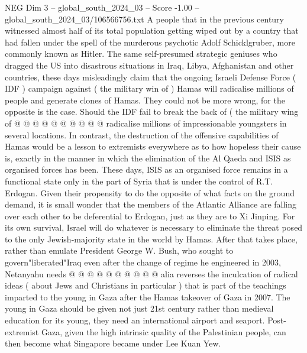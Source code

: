 \begin{textsample}{NEG Dim 3 – global\_south\_2024\_03 – Score -1.00 – global\_south\_2024\_03/106566756.txt}
A people that in the previous century witnessed almost half of its total population getting wiped out by a country that had fallen under the spell of the murderous psychotic Adolf Schicklgruber, more commonly known as Hitler.
The same self-presumed strategic geniuses who dragged the US into disastrous situations in Iraq, Libya, Afghanistan and other countries, these days misleadingly claim that the ongoing Israeli Defense Force ( IDF ) campaign against ( the military win of ) Hamas will radicalise millions of people and generate clones of Hamas.
They could not be more wrong, for the opposite is the case.
Should the IDF fail to break the back of ( the military wing of @ @ @ @ @ @ @ @ @ @ radicalise millions of impressionable youngsters in several locations.
In contrast, the destruction of the offensive capabilities of Hamas would be a lesson to extremists everywhere as to how hopeless their cause is, exactly in the manner in which the elimination of the Al Qaeda and ISIS as organised forces has been.
These days, ISIS as an organised force remains in a functional state only in the part of Syria that is under the control of R.T.
Erdogan.
Given their propensity to do the opposite of what facts on the ground demand, it is small wonder that the members of the Atlantic Alliance are falling over each other to be deferential to Erdogan, just as they are to Xi Jinping.
For its own survival, Israel will do whatever is necessary to eliminate the threat posed to the only Jewish-majority state in the world by Hamas.
After that takes place, rather than emulate President George W.
Bush, who sought to govern"liberated"Iraq even after the change of regime he engineered in 2003, Netanyahu needs @ @ @ @ @ @ @ @ @ @ alia reverses the inculcation of radical ideas ( about Jews and Christians in particular ) that is part of the teachings imparted to the young in Gaza after the Hamas takeover of Gaza in 2007.
The young in Gaza should be given not just 21st century rather than medieval education for its young, they need an international airport and seaport.
Post-extremist Gaza, given the high intrinsic quality of the Palestinian people, can then become what Singapore became under Lee Kuan Yew.

\end{textsample}
